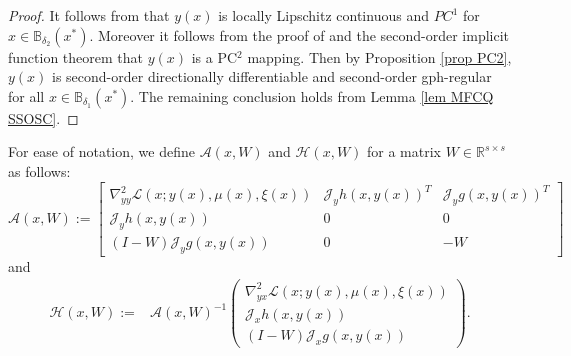 \documentclass[11pt]{article}
\theoremstyle{definition}
\theoremstyle{remark}
\numberwithin{equation}{section}
\begin{document}
\begin{proof}
  It follows from \cite[Theorem 2]{Ralph and Dempe 95} that $y(x)$ is locally Lipschitz continuous and $PC^1$ for $x \in \mathbb{B}_{\delta_2}(x^*)$.
 Moreover it follows from the proof of \cite[Proposition 7]{Ralph and Dempe 95} and the second-order implicit function theorem \cite[page 364]{Lang 93}  that $y(x)$ is a PC$^2$ mapping.
   Then by Proposition \ref{prop PC2},
  $y(x)$ is second-order directionally differentiable and  second-order gph-regular for all $x \in \mathbb{B}_{\delta_1}(x^*)$. The remaining conclusion holds from Lemma \ref{lem MFCQ SSOSC}.
\end{proof}


For ease of notation, we  define $\mathcal{A}(x,W)$ and $\mathcal{H}(x,W)$ for a matrix $W\in\mathbb{R}^{s\times s}$ as follows:
\begin{equation}\label{A(x,W)}
  \mathcal{A}(x,W):=\left[
		\begin{array}{ccc}
			\nabla_{yy}^2 \mathcal{L}(x;y(x),\mu(x),\xi(x))&\mathcal{J}_y h(x,y(x))^T&\mathcal{J}_y g(x,y(x))^T\\
             \mathcal{J}_y h(x,y(x))&0&0\\
			(I-W)\mathcal{J}_y g(x,y(x))&0&-W
		\end{array}\right]
\end{equation}
and
\begin{align}\label{H(x,W)}
  \mathcal{H}(x,W):=& \mathcal{A}(x,W)^{-1}
  \left(
		\begin{array}{c}
			\nabla_{yx}^2 \mathcal{L}(x;y(x),\mu(x),\xi(x))\\
\mathcal{J}_x h(x,y(x))\\
			(I-W)\mathcal{J}_x g(x,y(x))
		\end{array}\right).
\end{align}

\end{document}
